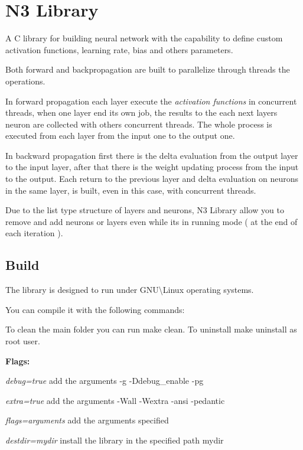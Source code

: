    

\section*{N3 Library}

A C library for building neural network with the capability to define custom activation functions, learning rate, bias and others parameters.

Both forward and backpropagation are built to parallelize through threads the operations.

In forward propagation each layer execute the {\itshape activation functions} in concurrent threads, when one layer end its own job, the results to the each next layer\textquotesingle{}s neuron are collected with others concurrent threads. The whole process is executed from each layer from the input one to the output one.

In backward propagation first there is the delta evaluation from the output layer to the input layer, after that there is the weight updating process from the input to the output. Each return to the previous layer and delta evaluation on neurons in the same layer, is built, even in this case, with concurrent threads.

Due to the list type structure of layers and neurons, N3 Library allow you to remove and add neurons or layers even while it\textquotesingle{}s in running mode ( at the end of each iteration ).

\subsection*{Build}

The library is designed to run under G\+NU\textbackslash{}Linux operating systems.

You can compile it with the following commands\+: 


To clean the main folder you can run {\ttfamily make clean}. To uninstall {\ttfamily make uninstall} as root user.

{\bfseries Flags\+:}
\begin{DoxyItemize}
\item {\itshape debug=true} add the arguments {\ttfamily -\/g -\/\+Ddebug\+\_\+enable -\/pg}
\item {\itshape extra=true} add the arguments {\ttfamily -\/\+Wall -\/\+Wextra -\/ansi -\/pedantic}
\item {\itshape flags=arguments} add the arguments specified
\item {\itshape destdir=mydir} install the library in the specified path {\ttfamily mydir}
\end{DoxyItemize}

